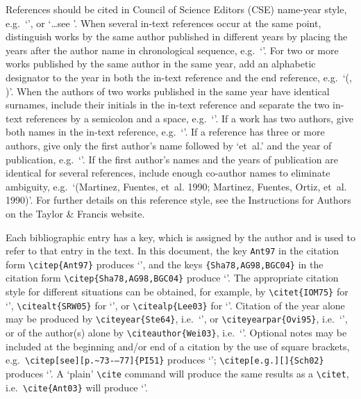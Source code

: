 \documentclass[]{interact}
\theoremstyle{plain}%
\theoremstyle{definition}
\theoremstyle{remark}
\begin{document}
References should be cited in Council of Science Editors (CSE) name-year style, e.g.\ `\citep{Rit74,Fel81,Fau02}', or `\ldots see \citet[p.~15]{Smi91}'. When several in-text references occur at the same point, distinguish works by the same author published in different years by placing the years after the author name in chronological sequence, e.g.\ `\citep{Smi70,Smi75}'. For two or more works published by the same author in the same year, add an alphabetic designator to the year in both the in-text reference and the end reference, e.g.\ `(\citealp{And60CJPS}, \citeyear{And60CJB})'. When the authors of two works published in the same year have identical surnames, include their initials in the in-text reference and separate the two in-text references by a semicolon and a space, e.g.\ `\citep{DawJ86,DawM86}'. If a work has two authors, give both names in the in-text reference, e.g.\ `\citep{Wei74}'. If a reference has three or more authors, give only the first author's name followed by `et~al.' and the year of publication, e.g.\ `\citep{Och03}'. If the first author's names and the years of publication are identical for several references, include enough co-author names to eliminate ambiguity, e.g.\ `(Martinez, Fuentes, et~al. 1990; Martinez, Fuentes, Ortiz, et~al. 1990)'. For further details on this reference style, see the Instructions for Authors on the Taylor \& Francis website.

Each bibliographic entry has a key, which is assigned by the author and is used to refer to that entry in the text. In this document, the key \verb"Ant97" in the citation form \verb"\citep{Ant97}" produces `\citep{Ant97}', and the keys \verb"{Sha78,AG98,BGC04}" in the citation form \verb"\citep{Sha78,AG98,BGC04}" produce `\citep{Sha78,AG98,BGC04}'. The appropriate citation style for different situations can be obtained, for example, by \verb"\citet{IOM75}" for `\citet{IOM75}', \verb"\citealt{SRW05}" for `\citealt{SRW05}', or \verb"\citealp{Lee03}" for `\citealp{Lee03}'. Citation of the year alone may be produced by \verb"\citeyear{Ste64}", i.e.\ `\citeyear{Ste64}', or \verb"\citeyearpar{Ovi95}", i.e.\ `\citeyearpar{Ovi95}', or of the author(s) alone by \verb"\citeauthor{Wei03}", i.e.\ `\citeauthor{Wei03}'. Optional notes may be included at the beginning and/or end of a citation by the use of square brackets, e.g.\ \verb"\citep[see][p.~73-–77]{PI51}" produces `\citep[see][p.~73--77]{PI51}'; \verb"\citep[e.g.][]{Sch02}" produces `\citep[e.g.][]{Sch02}'. A `plain' \verb"\cite" command will produce the same results as a \verb"\citet", i.e.\ \verb"\cite{Ant03}" will produce `\cite{Ant03}'.
\end{document}
